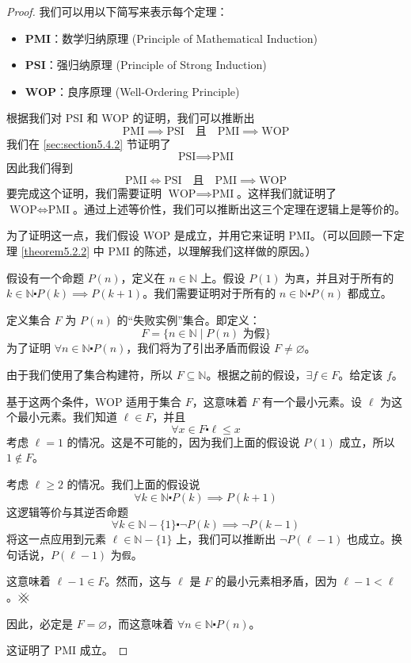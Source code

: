 \begin{proof}
    我们可以用以下简写来表示每个定理：
    \begin{itemize}
        \item \textbf{PMI}：数学归纳原理 (Principle of Mathematical Induction)
        \item \textbf{PSI}：强归纳原理 (Principle of Strong Induction)
        \item \textbf{WOP}：良序原理 (Well-Ordering Principle)
    \end{itemize}
    根据我们对 PSI 和 WOP 的证明，我们可以推断出
    \[\text{PMI} \implies \text{PSI} \quad\text{且}\quad \text{PMI} \implies \text{WOP}\]
    我们在 \ref{sec:section5.4.2} 节证明了
    \[\text{PSI} \implies \text{PMI}\]
    因此我们得到
    \[\text{PMI} \iff \text{PSI} \quad\text{且}\quad \text{PMI} \implies \text{WOP}\]
    要完成这个证明，我们需要证明 $\text{WOP} \implies \text{PMI}$。这样我们就证明了 $\text{WOP} \iff \text{PMI}$。通过上述等价性，我们可以推断出这三个定理在逻辑上是等价的。

    为了证明这一点，我们假设 WOP 是成立，并用它来证明 PMI。（可以回顾一下定理 \ref{theorem5.2.2} 中 PMI 的陈述，以理解我们这样做的原因。）

    假设有一个命题 $P(n)$，定义在 $n \in \mathbb{N}$ 上。假设 $P(1)$ 为\verb|真|，并且对于所有的 $k \in \mathbb{N} \centerdot P(k) \implies P(k+1)$。我们需要证明对于所有的 $n \in \mathbb{N} \centerdot P(n)$ 都成立。


    定义集合 $F$ 为 $P(n)$ 的``失败实例''集合。即定义：
    \[F = \{n \in \mathbb{N} \mid P(n) \text{ 为假}\}\]
    为了证明 $\forall n \in \mathbb{N} \centerdot P(n)$，我们将为了引出矛盾而假设 $F \ne \varnothing$。

    由于我们使用了集合构建符，所以 $F \subseteq \mathbb{N}$。根据之前的假设，$\exists f \in F$。给定该 $f$。

    基于这两个条件，WOP 适用于集合 $F$，这意味着 $F$ 有一个最小元素。设 $\ell$ 为这个最小元素。我们知道 $\ell \in F$，并且
    \[\forall x \in F \centerdot \ell \le x\]
    考虑 $\ell = 1$ 的情况。这是不可能的，因为我们上面的假设说 $P(1)$ 成立，所以 $1 \notin F$。

    考虑 $\ell \ge 2$ 的情况。我们上面的假设说
    \[\forall k \in \mathbb{N} \centerdot P(k) \implies P(k+1)\]
    这逻辑等价与其逆否命题
    \[\forall k \in \mathbb{N} - \{1\} \centerdot \neg P(k) \implies \neg P(k-1)\]
    将这一点应用到元素 $\ell \in \mathbb{N} - \{1\}$ 上，我们可以推断出 $\neg P(\ell - 1)$ 也成立。换句话说，$P(\ell-1)$ 为\verb|假|。

    这意味着 $\ell-1 \in F$。然而，这与 $\ell$ 是 $F$ 的最小元素相矛盾，因为 $\ell - 1 < \ell$。$\hashx$

    因此，必定是 $F = \varnothing$，而这意味着 $\forall n \in \mathbb{N} \centerdot P(n)$。

    这证明了 PMI 成立。
\end{proof}

